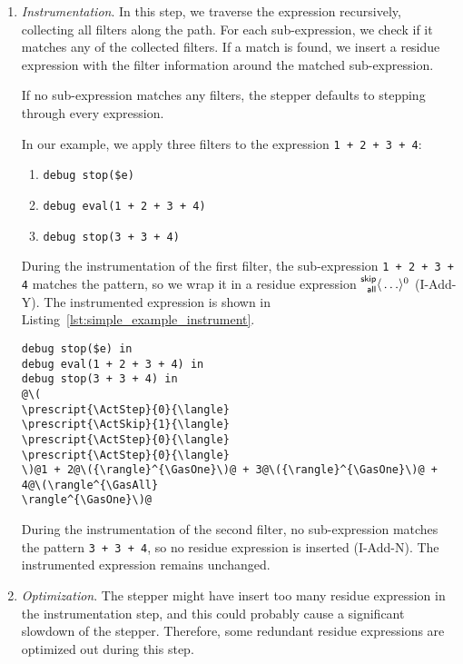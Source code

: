 \begin{enumerate}
\item \emph{Instrumentation}. \label{num:simple_example_instrument} In this
  step, we traverse the expression recursively, collecting all filters along the
  path. For each sub-expression, we check if it matches any of the collected
  filters. If a match is found, we insert a residue expression with the filter
  information around the matched sub-expression.

  If no sub-expression matches any filters, the stepper defaults to stepping
  through every expression. 

  In our example, we apply three filters to the expression
  \lstinline[language=hazel]{1 + 2 + 3 + 4}:
  \begin{enumerate}
  \item \lstinline[language=hazel]{debug stop($e)}
  \item \lstinline[language=hazel]{debug eval(1 + 2 + 3 + 4)}
  \item \lstinline[language=hazel]{debug stop(3 + 3 + 4)}
  \end{enumerate}

  During the instrumentation of the first filter, the sub-expression
  \lstinline[language=hazel]{1 + 2 + 3 + 4} matches the pattern, so we wrap it
  in a residue expression \(\prescript{\mathsf{skip}}{\mathsf{all}}{\langle} \ldots \rangle^{0}\) (I-Add-Y).
  The instrumented expression is shown in
  Listing~\ref{lst:simple_example_instrument}.

  \begin{lstlisting}[language=hazel,caption={Program after instrumentation},label={lst:simple_example_instrument}]
debug stop($e) in
debug eval(1 + 2 + 3 + 4) in
debug stop(3 + 3 + 4) in
@\(
\prescript{\ActStep}{0}{\langle}
\prescript{\ActSkip}{1}{\langle}
\prescript{\ActStep}{0}{\langle}
\prescript{\ActStep}{0}{\langle}
\)@1 + 2@\({\rangle}^{\GasOne}\)@ + 3@\({\rangle}^{\GasOne}\)@ + 4@\(\rangle^{\GasAll}
\rangle^{\GasOne}\)@\end{lstlisting}

  During the instrumentation of the second filter, no sub-expression matches the
  pattern \lstinline[language=hazel]{3 + 3 + 4}, so no residue expression is
  inserted (I-Add-N). The instrumented expression remains unchanged.

\item \emph{Optimization}. The stepper might have insert too many
  residue expression in the instrumentation step, and this could
  probably cause a significant slowdown of the stepper. Therefore,
  some redundant residue expressions are optimized out during this
  step.


\end{enumerate}

